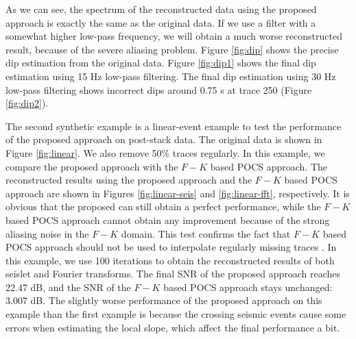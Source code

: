 As we can see, the spectrum of the reconstructed data using the proposed approach is exactly the same as the original data. If we use a filter with a somewhat higher low-pass frequency, we will obtain a much worse reconstructed result, because of the severe aliasing problem. Figure \ref{fig:dip} shows the precise dip estimation from the original data. Figure \ref{fig:dip1} shows the final dip estimation using 15 Hz low-pass filtering. The final dip estimation using 30 Hz low-pass filtering shows incorrect dips around 0.75 s at trace 250 (Figure \ref{fig:dip2}). 

The second synthetic example is a linear-event example to test the performance of the proposed approach on post-stack data. The original data is shown in Figure \ref{fig:linear}. We also remove 50\% traces regularly. In this example, we compare the proposed approach with the $F-K$ based POCS approach. The reconstructed results using the proposed approach and the $F-K$ based POCS approach are shown in Figures \ref{fig:linear-seis} and \ref{fig:linear-fft}, respectively. It is obvious that the proposed can still obtain a perfect performance, while the $F-K$ based POCS approach cannot obtain any improvement because of the strong aliasing noise in the $F-K$ domain. This test confirms the fact that $F-K$ based POCS approach should not be used to interpolate regularly missing traces \cite{spitz1991,mostafa2007,mostafa2010}. In this example, we use 100 iterations to obtain the reconstructed results of both seislet and Fourier transforms. The final SNR of the proposed approach reaches 22.47 dB, and the SNR of the $F-K$ based POCS approach stays unchanged: 3.007 dB. The slightly worse performance of the proposed approach on this example than the first example is because the crossing seismic events cause some errors when estimating the local slope, which affect the final performance a bit.  





